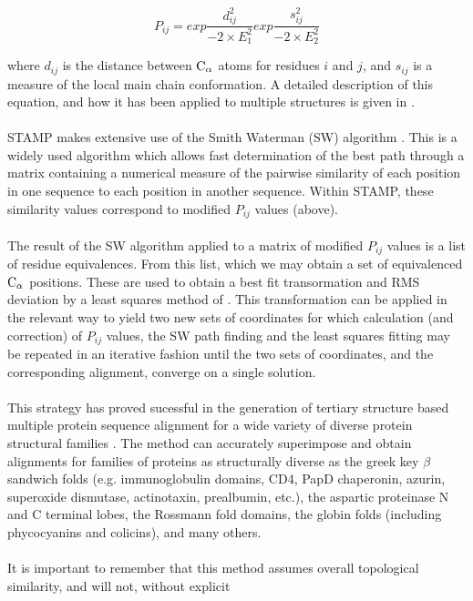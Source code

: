 \[
P_{ij} = exp \frac{d_{ij}^{2}}{-2 \times E_{1}^{2}} 
         exp \frac{s_{ij}^{2}}{-2 \times E_{2}^{2}} 
\]

where $d_{ij}$ is the distance between ${\rm C}_{\alpha}$ atoms for residues $i$
and $j$, and $s_{ij}$ is a measure of the local main chain conformation.
A detailed description of this equation, and how it has been
applied to multiple structures is given in \cite{rb92b}. \\
\\
STAMP makes extensive use of the Smith Waterman (SW) algorithm 
\cite{smith81,barton93b,timewarps}.  This is a widely used algorithm 
which allows fast determination of the best path through a matrix 
containing a numerical measure of the pairwise similarity of each 
position in one sequence to each position in another sequence.  Within 
STAMP, these similarity values correspond to modified $P_{ij}$ 
values (above).\\
\\
The result of the SW algorithm applied to a matrix of modified $P_{ij}$
values is a list of residue equivalences.  From this list, which
we may obtain a set of equivalenced ${\rm C}_{\alpha}$ positions.  These are
used to obtain a best fit transormation and RMS deviation by a
least squares method of \cite{kabsch78,mclachlan79}.  This
transformation can be applied in the relevant way to yield two
new sets of coordinates for which calculation (and correction) of
$P_{ij}$ values, the SW path finding and the least squares fitting may
be repeated in an iterative fashion until the two sets of
coordinates, and the corresponding alignment, converge on a
single solution.\\
\\
This strategy has proved sucessful in the generation of tertiary
structure based multiple protein sequence alignment for a wide
variety of diverse protein structural families 
\cite{rb92b,rb93b,rb93c,rb94,russell94}.  
The method can accurately superimpose and obtain alignments for families 
of proteins as structurally diverse as the greek key $\beta$ sandwich 
folds (e.g. immunoglobulin domains, CD4, PapD chaperonin, 
azurin, superoxide dismutase, actinotaxin, prealbumin, etc.), the
aspartic proteinase N and C terminal lobes, the Rossmann
fold domains, the globin folds (including phycocyanins and
colicins), and many others.\\
\\
It is important to remember that this method assumes overall
topological similarity, and will not, without explicit
